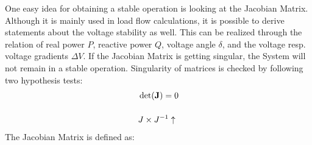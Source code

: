 One easy idea for obtaining a stable operation is looking at the Jacobian Matrix. 
Although it is mainly used in load flow calculations, it is possible to derive statements about the voltage stability as well.
This can be realized through the relation of real power $P$, reactive power $Q$, voltage angle $\delta$, and the voltage resp. voltage gradients $\Delta V$. 
If the Jacobian Matrix is getting singular, the System will not remain in a stable operation.
Singularity of matrices is checked by following two hypothesis tests:
\begin{align}
    &\det(\mathrm{\textbf{J}})=0 \label{eq:jacobian-det} \\[12pt]
    &J \times J^{-1} \uparrow \label{eq:jacobian-rank}
\end{align}
The Jacobian Matrix is defined as:
